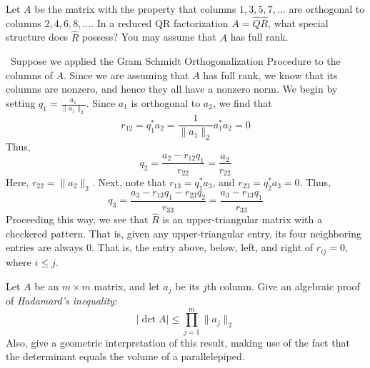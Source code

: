 \documentclass[12pt]{article}
\newenvironment{ex}[2][Exercise]{\begin{trivlist}
		\item[\hskip \labelsep {\bfseries #1}\hskip \labelsep {\bfseries #2.}]}{\end{trivlist}}
\newenvironment{sol}[1][Solution]{\begin{trivlist}
		\item[\hskip \labelsep {\bfseries #1:}]}{\end{trivlist}}
\begin{document}
\begin{ex}{2}
	Let $A$ be the matrix with the property that columns $1,3,5,7,\ldots$ are orthogonal to columns
	$2,4,6,8,\ldots$. In a reduced QR factorization $A=\hat{Q}\hat{R}$, what special structure does
	$\hat{R}$ possess? You may assume that $A$ has full rank.
\end{ex}

\begin{sol}
	\
	Suppose we applied the Gram Schmidt Orthogonalization Procedure to the columns of $A$. Since we are
	assuming that $A$ has full rank, we know that its columns are nonzero, and hence they all have a
	nonzero norm. We begin by setting $q_1=\frac{a_1}{\lVert a_1\rVert_2}$. Since $a_1$ is orthogonal to
	$a_2$, we find that
	\[
	r_{12}=q_1^*a_2=\frac{1}{\lVert a_1\rVert_2}a_1^*a_2=0
	\]
	Thus,
	\[
	q_2 = \frac{a_{2}-r_{12}q_1}{r_{22}}=\frac{a_2}{r_{22}}
	\]
	Here, $r_{22}=\lVert a_2\rVert_2$. Next, note that $r_{13}=q_1^*a_3$, and $r_{23}=q_2^*a_3=0$. Thus,
	\[
	q_{3}=\frac{a_3-r_{13}q_1-r_{23}q_2}{r_{33}}=\frac{a_3-r_{13}q_1}{r_{33}}
	\]
	Proceeding this way, we see that $\hat{R}$ is an upper-triangular matrix with a checkered pattern. That is,
	given any upper-triangular entry, its four neighboring entries are always 0. That is, the entry above, below,
	left, and right of $r_{ij}=0$, where $i\leq j$.
\end{sol}

\begin{ex}{3}
	Let $A$ be an $m\times m$ matrix, and let $a_j$ be its $j$th column. Give an algebraic proof of
	\emph{Hadamard's inequality}:
	\[
	|\det A|\leq \prod_{j=1}^{m}\lVert a_j\rVert_2
	\]
	Also, give a geometric interpretation of this result, making use of the fact that the determinant
	equals the volume of a parallelepiped.
\end{ex}
\end{document}
